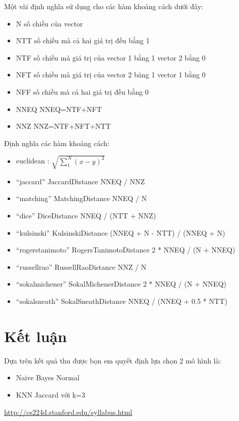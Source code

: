 \documentclass[a4paper,12pt]{report}
\begin{document}
Một vài định nghĩa sử dụng cho các hàm khoảng cách dưới đây:
\begin{itemize}
\item N số chiều của vector
\item NTT số chiều mà cả hai giá trị đều bằng 1
\item NTF số chiều mà giá trị của vector 1 bằng 1 vector 2 bằng 0
\item NFT số chiều mà giá trị của vector 2 băng 1 vector 1 bằng 0
\item NFF số chiều mà cả hai giá trị đều bằng 0
\item NNEQ NNEQ=NTF+NFT
\item NNZ NNZ=NTF+NFT+NTT 
\end{itemize}
Định nghĩa các hàm khoảng cách:
\begin{itemize}
\item euclidean : $\sqrt{\sum_1^N (x-y)^2}$
\item “jaccard”	JaccardDistance	NNEQ / NNZ
\item “matching”	MatchingDistance	NNEQ / N
\item “dice”	DiceDistance	NNEQ / (NTT + NNZ)
\item “kulsinski”	KulsinskiDistance	(NNEQ + N - NTT) / (NNEQ + N)\item “rogerstanimoto”	RogersTanimotoDistance	2 * NNEQ / (N + NNEQ)
\item “russellrao”	RussellRaoDistance	NNZ / N
\item “sokalmichener”	SokalMichenerDistance	2 * NNEQ / (N + NNEQ)
\item “sokalsneath”	SokalSneathDistance	NNEQ / (NNEQ + 0.5 * NTT)
\end{itemize}
\section{Kết luận}
Dựa trên kết quả thu được bọn em quyết định lựa chọn 2 mô hình là: 
\begin{itemize}
\item Naive Bayes Normal
\item KNN Jaccard với k=3
\end{itemize}
\begin{thebibliography}{9}
 \url{http://cs224d.stanford.edu/syllabus.html}
\end{thebibliography}
\end{document}
